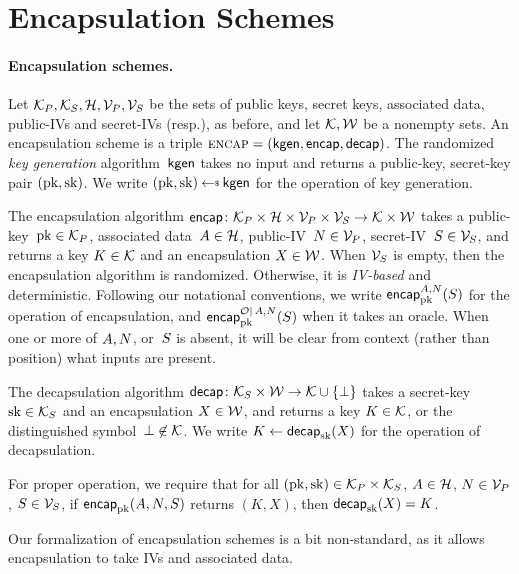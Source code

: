 \section{Encapsulation Schemes}
\label{sec:kem}

\paragraph{Encapsulation schemes. }
Let $\pubkeys, \seckeys, \adata, \pubivs, \secivs$ be the sets of public keys, secret keys, associated data, public-IVs and secret-IVs (resp.), as before, and let $\keys,\wraps$ be a nonempty sets.
%
An encapsulation scheme is a triple $\encapscheme=(\pkgen,\encap,\decap)$.   The randomized \emph{key generation} algorithm~$\pkgen$ takes no input and returns a public-key, secret-key pair $(\pk,\sk)$.  We write $(\pk,\sk)\getsr\pkgen$ for the operation of key generation. 

The encapsulation algorithm $\encap \colon \pubkeys \times \adata \times \pubivs \times \secivs \to \keys \times \wraps$ takes a public-key~$\pk\in\pubkeys$, associated data~$\header \in \adata$, public-IV~$\pubiv \in \pubivs$, secret-IV~$\seciv \in \secivs$, and returns a key $K \in \keys$ and an encapsulation $X \in \wraps$. 
When $\secivs$ is empty, then the encapsulation algorithm is randomized.  Otherwise, it is \emph{IV-based} and deterministic.  Following our notational conventions, we write $\encapprim{\pk}{\header,\pubiv}{\seciv}$ for the operation of encapsulation, and $\encapprimO{\pk}{\header,\pubiv}{\seciv}{\mathcal{O}}$ when it takes an oracle.  When one or more of $\header,\pubiv$, or~$\seciv$ is absent, it will be clear from context (rather than position) what inputs are present.

The decapsulation algorithm $\decap \colon \seckeys \times \wraps \to \keys \cup \{\bot\}$ takes a secret-key~$\sk\in\seckeys$ and an encapsulation $X \in \wraps$, and returns a key $K \in \keys$, or the distinguished symbol~$\bot \not\in \keys$.  We write $K \gets \decap_{\sk}(\wrap)$ for the operation of decapsulation. 

For proper operation, we require that for all $(\pk,\sk)\in\pubkeys\times\seckeys$, $\header\in\adata$, $\pubiv\in\pubivs$, $\seciv\in\secivs$, if $\encap_{\pk}(\header,\pubiv,\seciv)$ returns $(K,X)$, then $\decap_{\sk}(X)=K$.

Our formalization of encapsulation schemes is a bit non-standard, as it allows encapsulation to take IVs and associated data.

